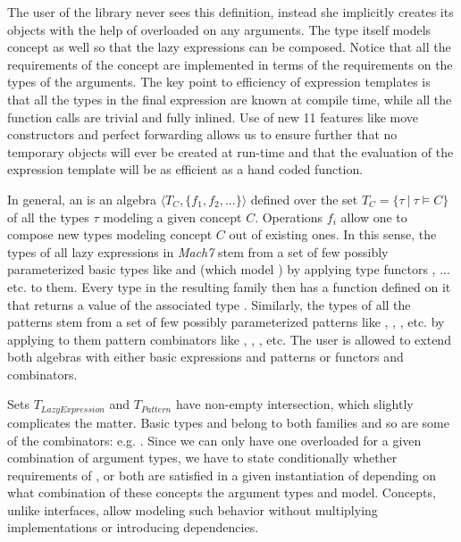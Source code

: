 \noindent
The user of the library never sees this definition, instead she implicitly 
creates its objects with the help of overloaded  on any 
 arguments. The type itself models  
concept as well so that the lazy expressions can be composed. Notice that all 
the requirements of the concept are implemented in terms of the requirements 
on the types of the arguments. The key point to efficiency of expression 
templates is that all the types in the final expression are known at compile 
time, while all the function calls are trivial and fully inlined. Use of new 
\Cpp{}11 features like move constructors and perfect forwarding allows us to 
ensure further that no temporary objects will ever be created at run-time and 
that the evaluation of the expression template will be as efficient as a hand 
coded function.

In general, an  is an algebra $\langle T_C,\{f_1,f_2,...\}\rangle$ 
defined over the set $T_C = \{\tau~|~\tau \models C\}$ of all the types $\tau$ 
modeling a given concept $C$. Operations $f_i$ allow one to compose new types  
modeling concept $C$ out of existing ones. In this sense, the types of all lazy 
expressions in \emph{Mach7} stem from a set of few possibly parameterized basic 
types like  and  (which model ) 
by applying type functors ,  ... etc. to them. Every type 
in the resulting family then has a function  defined on it that 
returns a value of the associated type . Similarly, the types 
of all the patterns stem from a set of few possibly parameterized patterns like 
, , ,  etc. by applying to 
them pattern combinators like , , 
,  etc. The user is allowed to extend both 
algebras with either basic expressions and patterns or functors and combinators. 

Sets $T_{LazyExpression}$ and $T_{Pattern}$ have non-empty intersection, which 
slightly complicates the matter. Basic types  and  
belong to both families and so are some of the combinators: e.g. 
. Since we can only have one overloaded  for 
a given combination of argument types, we have to state conditionally whether 
requirements of ,  or both are satisfied in a 
given instantiation of  depending on what combination 
of these concepts the argument types  and  model. Concepts, 
unlike interfaces, allow modeling such behavior without multiplying 
implementations or introducing dependencies.

